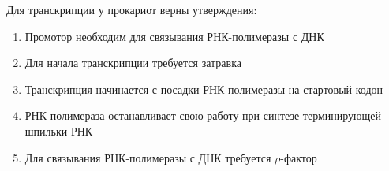 
Для транскрипции у прокариот верны утверждения:

\begin{enumerate}
    \item Промотор необходим для связывания РНК-полимеразы с ДНК
    \item Для начала транскрипции требуется затравка 
    \item Транскрипция начинается с посадки РНК-полимеразы на стартовый кодон
    \item РНК-полимераза останавливает свою работу при синтезе терминирующей шпильки РНК
    \item Для связывания РНК-полимеразы с ДНК требуется $\rho$-фактор 
\end{enumerate}



